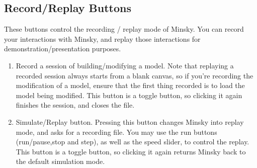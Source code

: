\subsection{Record/Replay Buttons}
\label{RecReplayButtons}


These buttons control the recording / replay mode of Minsky. You can
record your interactions with Minsky, and replay those interactions
for demonstration/presentation purposes. 

\begin{enumerate}
  \item Record a session of building/modifying a model. Note that
    replaying a recorded session always starts from a blank canvas, so
    if you're recording the modification of a model, ensure that the
    first thing recorded is to load the model being modified. This
    button is a toggle button, so clicking it again finishes the
    session, and closes the file.
  \item Simulate/Replay button. Pressing this button changes Minsky
    into replay mode, and asks for a recording file. You may use the
    run buttons (run/pause,stop and step), as well as the speed
    slider, to control the replay. This button is a toggle button, so
    clicking it again returns Minsky back to the default simulation
    mode.
\end{enumerate}

%

